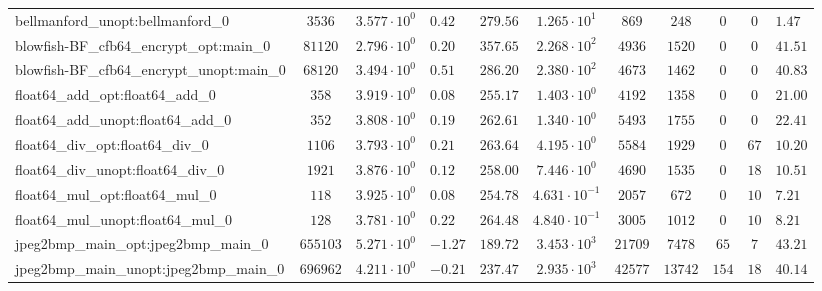 \begin{tabular}{|l|c|HHc|c|c|c|c|cH|}
bellmanford\_unopt:bellmanford\_0               & $ 3536     $ & $ 3.577 \cdot 10^{0} $ & $ 0.42  $ & $ 279.56 $ & $ 1.265 \cdot 10^{1}  $ & $ 869    $ & $ 248   $ & $ 0   $ & $ 0   $ & $ 1.47    $ \\
blowfish-BF\_cfb64\_encrypt\_opt:main\_0        & $ 81120    $ & $ 2.796 \cdot 10^{0} $ & $ 0.20  $ & $ 357.65 $ & $ 2.268 \cdot 10^{2}  $ & $ 4936   $ & $ 1520  $ & $ 0   $ & $ 0   $ & $ 41.51   $ \\
blowfish-BF\_cfb64\_encrypt\_unopt:main\_0      & $ 68120    $ & $ 3.494 \cdot 10^{0} $ & $ 0.51  $ & $ 286.20 $ & $ 2.380 \cdot 10^{2}  $ & $ 4673   $ & $ 1462  $ & $ 0   $ & $ 0   $ & $ 40.83   $ \\
float64\_add\_opt:float64\_add\_0               & $ 358      $ & $ 3.919 \cdot 10^{0} $ & $ 0.08  $ & $ 255.17 $ & $ 1.403 \cdot 10^{0}  $ & $ 4192   $ & $ 1358  $ & $ 0   $ & $ 0   $ & $ 21.00   $ \\
float64\_add\_unopt:float64\_add\_0             & $ 352      $ & $ 3.808 \cdot 10^{0} $ & $ 0.19  $ & $ 262.61 $ & $ 1.340 \cdot 10^{0}  $ & $ 5493   $ & $ 1755  $ & $ 0   $ & $ 0   $ & $ 22.41   $ \\
float64\_div\_opt:float64\_div\_0               & $ 1106     $ & $ 3.793 \cdot 10^{0} $ & $ 0.21  $ & $ 263.64 $ & $ 4.195 \cdot 10^{0}  $ & $ 5584   $ & $ 1929  $ & $ 0   $ & $ 67  $ & $ 10.20   $ \\
float64\_div\_unopt:float64\_div\_0             & $ 1921     $ & $ 3.876 \cdot 10^{0} $ & $ 0.12  $ & $ 258.00 $ & $ 7.446 \cdot 10^{0}  $ & $ 4690   $ & $ 1535  $ & $ 0   $ & $ 18  $ & $ 10.51   $ \\
float64\_mul\_opt:float64\_mul\_0               & $ 118      $ & $ 3.925 \cdot 10^{0} $ & $ 0.08  $ & $ 254.78 $ & $ 4.631 \cdot 10^{-1} $ & $ 2057   $ & $ 672   $ & $ 0   $ & $ 10  $ & $ 7.21    $ \\
float64\_mul\_unopt:float64\_mul\_0             & $ 128      $ & $ 3.781 \cdot 10^{0} $ & $ 0.22  $ & $ 264.48 $ & $ 4.840 \cdot 10^{-1} $ & $ 3005   $ & $ 1012  $ & $ 0   $ & $ 10  $ & $ 8.21    $ \\
jpeg2bmp\_main\_opt:jpeg2bmp\_main\_0           & $ 655103   $ & $ 5.271 \cdot 10^{0} $ & $ -1.27 $ & $ 189.72 $ & $ 3.453 \cdot 10^{3}  $ & $ 21709  $ & $ 7478  $ & $ 65  $ & $ 7   $ & $ 43.21   $ \\
jpeg2bmp\_main\_unopt:jpeg2bmp\_main\_0         & $ 696962   $ & $ 4.211 \cdot 10^{0} $ & $ -0.21 $ & $ 237.47 $ & $ 2.935 \cdot 10^{3}  $ & $ 42577  $ & $ 13742 $ & $ 154 $ & $ 18  $ & $ 40.14   $ \\

\end{tabular}

